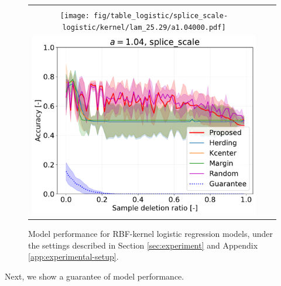 \begin{figure}[h]
\begin{tabular}{ccc}
		&
		\begin{minipage}[b]{0.3\hsize}\centering {\small Dataset: splice, $\lambda=n_\mathrm \cdot 10^{-1.5}$}\\\texttt{[image: fig/table\_logistic/splice\_scale-logistic/kernel/lam\_25.29/a1.04000.pdf]}\end{minipage}
		&
		\begin{minipage}[b]{0.3\hsize}\centering {\small Dataset: splice, $\lambda=n$}\\\includegraphics[width=0.8\hsize]{fig/table_logistic/splice_scale-logistic/kernel/lam_800/a1.04000.pdf}\end{minipage}
		\\
	
	\end{tabular}
	\caption{Model performance for RBF-kernel logistic regression models, under the settings described in Section \ref{sec:experiment} and Appendix \ref{app:experimental-setup}.}
	\label{fig:result-acc-logistic}
	\end{figure}


Next, we show a guarantee of model performance.


